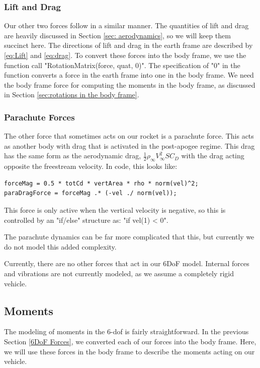 \documentclass[12pt]{report}
\begin{document}
\subsubsection{Lift and Drag}
Our other two forces follow in a similar manner. The quantities of lift and drag are heavily discussed in Section \ref{sec: aerodynamics}, so we will keep them succinct here. The directions of lift and drag in the earth frame are described by \eqref{eq:Lift} and \eqref{eq:drag}. To convert these forces into the \gls{body frame}, we use the function call "RotationMatrix(force, quat, 0)". The specification of "0" in the function converts a force in the earth frame into one in the \gls{body frame}. We need the \gls{body frame} force for computing the moments in the \gls{body frame}, as discussed in Section \ref{sec:rotations in the body frame}.
\subsubsection{Parachute Forces}
The other force that sometimes acts on our rocket is a parachute force. This acts as another body with drag that is activated in the post-apogee regime. This drag has the same form as the aerodynamic drag, $\frac{1}{2}\rho_{\infty} V_{\infty}^2SC_D$ with the drag acting opposite the \gls{freestream} velocity. In code, this looks like:
\begin{lstlisting}[style=Matlab-editor]
forceMag = 0.5 * totCd * vertArea * rho * norm(vel)^2;
paraDragForce = forceMag .* (-vel ./ norm(vel)); 
\end{lstlisting}
This force is only active when the vertical velocity is negative, so this is controlled by an "if/else" structure as: "if vel(1) < 0". 

The parachute dynamics can be far more complicated that this, but currently we do not model this added complexity. 

Currently, there are no other forces that act in our 6DoF model. Internal forces and vibrations are not currently modeled, as we assume a completely rigid vehicle.
\subsection{Moments}
The modeling of moments in the 6-\gls{dof} is fairly straightforward. In the previous Section \ref{6DoF Forces}, we converted each of our forces into the \gls{body frame}. Here, we will use these forces in the \gls{body frame} to describe the moments acting on our vehicle. 
\end{document}

